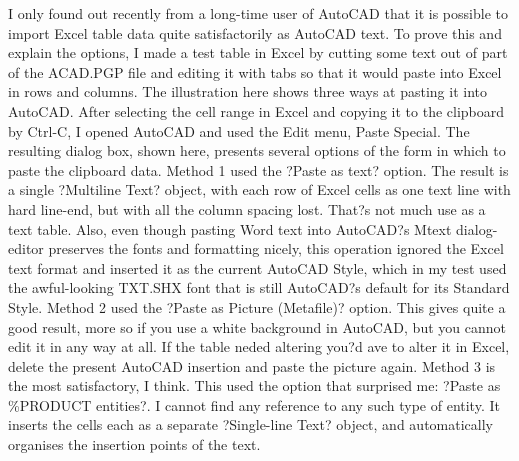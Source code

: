 \documentclass[a4paper]{article}
\begin{document}
{I only found out recently from a long-time user of AutoCAD that it is possible to import Excel table data quite satisfactorily as AutoCAD text. To prove this and explain the options, I made a test table in Excel by cutting some text out of part of the ACAD.PGP file and editing it with tabs so that it would paste into Excel in rows and columns. The illustration here shows three ways at pasting it into AutoCAD. After selecting the cell range in Excel and copying it to the clipboard by Ctrl-C, I opened AutoCAD and used the Edit menu, Paste Special. The resulting dialog box, shown here, presents several options of the form in which to paste the clipboard data.
Method 1 used the ?Paste as text? option. The result is a single ?Multiline Text? object, with each row of Excel cells as one text line with hard line-end, but with all the column spacing lost. That?s not much use as a text table. Also, even though pasting Word text into AutoCAD?s Mtext dialog-editor preserves the fonts and formatting nicely, this operation ignored the Excel text format and inserted it as the current AutoCAD Style, which in my test used the awful-looking TXT.SHX font that is still AutoCAD?s default for its Standard Style.
Method 2 used the ?Paste as Picture (Metafile)? option. This gives quite a good result, more so if you use a white background in AutoCAD, but you cannot edit it in any way at all. If the table neded altering you?d ave to alter it in Excel, delete the present AutoCAD insertion and paste the picture again.
Method 3 is the most satisfactory, I think. This used the option that surprised me: ?Paste as \%PRODUCT entities?. I cannot find any reference to any such type of entity. It inserts the cells each as a separate ?Single-line Text? object, and automatically organises the insertion points of the text.
}
\end{document}
